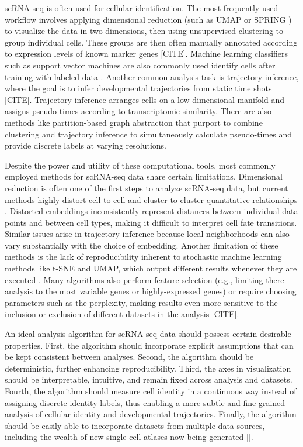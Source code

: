 \documentclass[aps,superscriptaddress, notitlepage,longbibliography]{revtex4-1}
\begin{document}
scRNA-seq is often used for cellular identification. The most frequently used workflow involves applying dimensional reduction (such as UMAP \cite{mcinnes_umap_2018} or SPRING \cite{weinreb_spring_2018}) to visualize the data in two dimensions, then using unsupervised clustering to group individual cells. These groups are then often manually annotated according to expression levels of known marker genes [CITE]. Machine learning classifiers such as support vector machines are also commonly used identify cells after training with labeled data \cite{abdelaal_comparison_2019}. Another common analysis task is trajectory inference, where the goal is to infer developmental trajectories from static time shots [CITE]. Trajectory inference arranges cells on a low-dimensional manifold and assigns pseudo-times according to transcriptomic similarity. There are also methods like partition-based graph abstraction \cite{wolf_paga_2019} that purport to combine clustering and trajectory inference to simultaneously calculate pseudo-times and provide discrete labels at varying resolutions. 

Despite the power and utility of these computational tools, most commonly employed methods for scRNA-seq data share certain limitations. Dimensional reduction is often one of the first steps to analyze scRNA-seq data, but current methods highly distort cell-to-cell and cluster-to-cluster quantitative relationships \cite{chari_specious_2021}. Distorted embeddings inconsistently represent distances between individual data points and between cell types, making it difficult to interpret cell fate transitions. Similar issues arise in trajectory inference because  local neighborhoods can also vary substantially with the choice of embedding. Another limitation of these methods is the lack of reproducibility inherent to stochastic machine learning methods like t-SNE and UMAP, which output different results whenever they are executed  \cite{wattenberg_how_2016}. Many algorithms also perform feature selection (e.g., limiting there analysis to the most variable genes or highly-expressed genes) or require choosing parameters such as the perplexity, making results even more sensitive to the inclusion or exclusion of different datasets in the analysis [CITE].

An ideal analysis algorithm for scRNA-seq data should possess certain desirable properties. 
First, the algorithm should incorporate explicit assumptions that can be kept consistent between analyses. Second, the algorithm should be deterministic, further enhancing reproducibility. Third, the axes in visualization should be interpretable, intuitive, and remain fixed across analysis and datasets. Fourth, the algorithm should measure cell identity in a continuous way instead of assigning discrete identity labels, thus enabling a more subtle and fine-grained analysis of cellular identity and developmental trajectories. Finally, the algorithm should be easily able to incorporate datasets from multiple data sources, including the wealth of new single cell atlases now being generated [].
\end{document}
